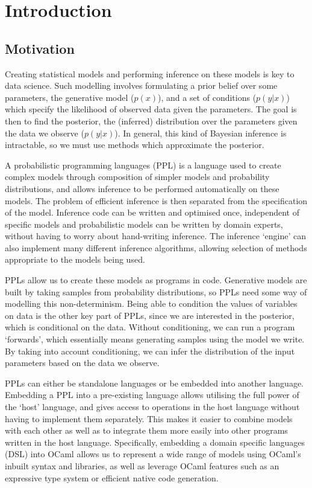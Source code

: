 \chapter{Introduction}

\section{Motivation}
Creating statistical models and performing inference on these models is key to data science. Such modelling involves formulating a prior belief over some parameters, the generative model ($p(x)$), and a set of conditions ($p(y|x)$) which specify the likelihood of observed data given the parameters. The goal is then to find the posterior, the (inferred) distribution over the parameters given the data we observe ($p(y|x)$). In general, this kind of Bayesian inference is intractable, so we must use methods which approximate the posterior.

A probabilistic programming languages (PPL) is a language used to create complex models through composition of simpler models and probability distributions, and allows inference to be performed automatically on these models. The problem of efficient inference is then separated from the specification of the model. Inference code can be written and optimised once, independent of specific models and probabilistic models can be written by domain experts, without having to worry about hand-writing inference. The inference `engine' can also implement many different inference algorithms, allowing selection of methods appropriate to the models being used.

PPLs allow us to create these models as programs in code. Generative models are built by taking samples from probability distributions, so PPLs need some way of modelling this non-determinism. Being able to condition the values of variables on data is the other key part of PPLs, since we are interested in the posterior, which is conditional on the data. Without conditioning, we can run a program `forwards', which essentially means generating samples using the model we write. By taking into account conditioning, we can infer the distribution of the input parameters based on the data we observe.

PPLs can either be standalone languages or be embedded into another language. Embedding a PPL into a pre-existing language allows utilising the full power of the `host' language, and gives access to operations in the host language without having to implement them separately. This makes it easier to combine models with each other as well as to integrate them more easily into other programs written in the host language. Specifically, embedding a domain specific languages (DSL) into OCaml allows us to represent a wide range of models using OCaml's inbuilt syntax and libraries, as well as leverage OCaml features such as an expressive type system or efficient native code generation.

